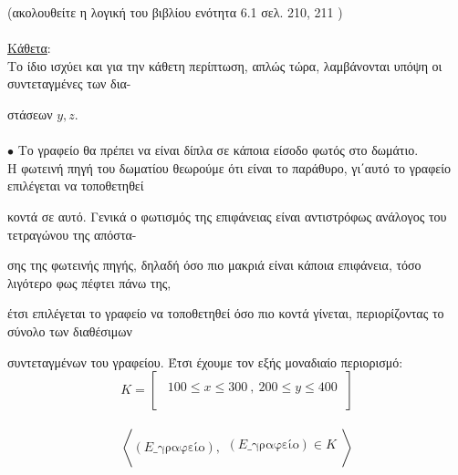\documentclass[10pt]{article}
\begin{document}
\hspace{15mm}(ακολουθείτε η λογική του βιβλίου ενότητα 6.1 σελ. 210, 211 )\\ \\

\hspace{15mm}\underline{Κάθετα}: \\

\hspace{15mm}Το ίδιο ισχύει και για την κάθετη περίπτωση, απλώς τώρα, λαμβάνονται υπόψη οι συντεταγμένες των δια-

\hspace{15mm}στάσεων $y,z$.\\ \\

\hspace{10mm}$\bullet$ Το γραφείο θα πρέπει να είναι δίπλα σε κάποια είσοδο φωτός στο δωμάτιο. \\

\hspace{15mm}Η φωτεινή πηγή του δωματίου θεωρούμε ότι είναι το παράθυρο, γι΄αυτό το γραφείο επιλέγεται να τοποθετηθεί  

\hspace{15mm}κοντά σε αυτό. Γενικά ο φωτισμός της επιφάνειας είναι αντιστρόφως ανάλογος του τετραγώνου της απόστα-

\hspace{15mm}σης της φωτεινής πηγής, δηλαδή όσο πιο μακριά είναι κάποια επιφάνεια, τόσο λιγότερο φως πέφτει πάνω της,

\hspace{15mm} έτσι  επιλέγεται το γραφείο να τοποθετηθεί όσο πιο κοντά γίνεται, περιορίζοντας το σύνολο των διαθέσιμων 

\hspace{15mm}συντεταγμένων του γραφείου. Έτσι έχουμε τον εξής μοναδιαίο περιορισμό:   \\

\[  K =
\left[  
\begin{array}{ll}
\\  \ \ 100 \leq x \leq 300\ , \ 200 \leq y \leq 400 \  \\ \\
     \end{array} 
\right ] \] 
\\ 

\[ 
\left<   (E\_\text{γραφείο}) , 
\begin{array}{ll}
\\  (E\_\text{γραφείο}) \in K \\ \\
     
     \end{array} 
\right > \] 
\\ 
\end{document}

